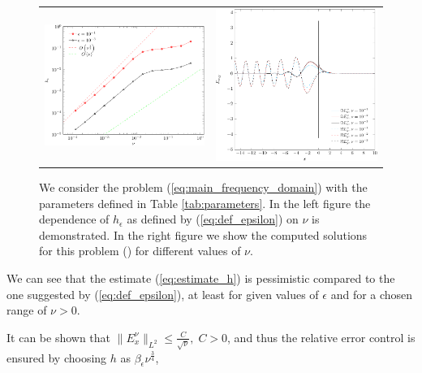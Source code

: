 \begin{figure}
\begin{tabular}{cc}
\includegraphics[height=0.32\textwidth]{pics_frequency_domain/h_nu.pdf}
&
\includegraphics[height=0.32\textwidth]{pics_frequency_domain/res_sol.pdf}
\end{tabular}
\caption{We consider the problem (\ref{eq:main_frequency_domain}) with the parameters 
defined in Table \ref{tab:parameters}. In the left figure the dependence of $h_{\epsilon}$ as defined by (\ref{eq:def_epsilon}) on $\nu$ is demonstrated.  
In the right figure we show the computed solutions for this problem () for different values of $\nu$. }
\label{fig:dependence}
\end{figure}
We can see that the estimate (\ref{eq:estimate_h}) is pessimistic compared to the one suggested by (\ref{eq:def_epsilon}), 
at least for given values of $\epsilon$ and for a chosen range of $\nu>0$.
\begin{remark}
It can be shown that $\|E^{\nu}_{x}\|_{L^2}\leq \frac{C}{\sqrt{\nu}},\; C>0$, 
and thus the relative error control
\bealn
 \leq \epsilon
\eealn
 is ensured by choosing $h$ as $\beta_{\epsilon}\nu^{\frac{3}{4}}$, 
\end{remark}

